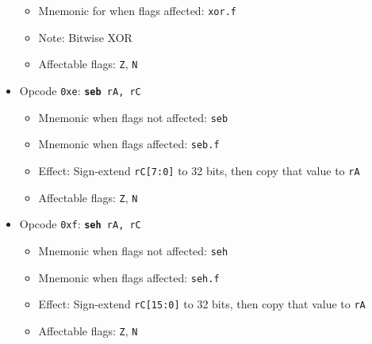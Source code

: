 \documentclass{article}
\begin{document}
\begin{itemize}
\begin{itemize}
			\item Mnemonic for when flags affected:  \texttt{xor.f}
			\item Note:  Bitwise XOR
			\item Affectable flags:
				\texttt{Z}, \texttt{N}
		\end{itemize}
		\item Opcode \texttt{0xe}:
			\texttt{\textbf{seb} rA, rC}
		\begin{itemize}
			\item Mnemonic when flags not affected:  \texttt{seb}
			\item Mnemonic when flags affected:  \texttt{seb.f}
			\item Effect:
				Sign-extend \texttt{rC[7:0]} to 32 bits, then copy that
				value to \texttt{rA}
			\item Affectable flags:
				\texttt{Z}, \texttt{N}
		\end{itemize}
		\item Opcode \texttt{0xf}:
			\texttt{\textbf{seh} rA, rC}
		\begin{itemize}
			\item Mnemonic when flags not affected:  \texttt{seh}
			\item Mnemonic when flags affected:  \texttt{seh.f}
			\item Effect:
				Sign-extend \texttt{rC[15:0]} to 32 bits, then copy that
				value to \texttt{rA}
			\item Affectable flags:
				\texttt{Z}, \texttt{N}
		\end{itemize}

\end{itemize}
\end{document}
